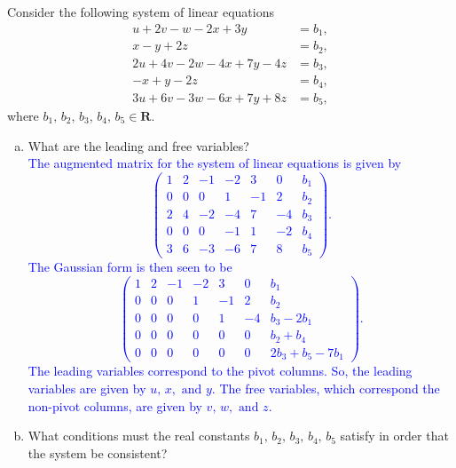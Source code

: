 \documentclass[a4paper,11pt]{article}
\newcommand{\R}{\mathbf{R}}
\newcommand{\BB}[1]{\textcolor{blue}{#1}}
\begin{document}
 Consider the following system of linear equations
\begin{align*}
  u+2v-w-2x+3y &= b_1, \\
  x-y+2z &= b_2, \\
  2u+4v-2w-4x+7y-4z &= b_3, \\
  -x+y-2z &= b_4, \\
  3u+6v-3w-6x+7y+8z &= b_5,
\end{align*}
where $b_1,\,b_2,\,b_3,\,b_4,\,b_5 \in \R$.
\begin{enumerate}[(a)]
\item What are the leading and free variables? \\

  \BB{
    The augmented matrix for the system of linear equations is given by
    \[
      \left(
        \begin{array}{rrrrrr|r}
          1 & 2 & -1 & -2 & 3 & 0 & b_{1} \\
          0 & 0 & 0 & 1 & -1 & 2 & b_{2} \\
          2 & 4 & -2 & -4 & 7 & -4 & b_{3} \\
          0 & 0 & 0 & -1 & 1 & -2 & b_{4} \\
          3 & 6 & -3 & -6 & 7 & 8 & b_{5}
        \end{array}
      \right).
    \]
    The Gaussian form is then seen to be
    \begin{equation}\label{Q4: gaussian form}
      \left(
        \begin{array}{rrrrrr|r}
          1 & 2 & -1 & -2 & 3 & 0 & b_1 \\
          0 & 0 & 0 & 1 & -1 & 2 & b_2 \\
          0 & 0 & 0 & 0 & 1 & -4 & b_3-2b_1 \\
          0 & 0 & 0 & 0 & 0 & 0 & b_2+b_4 \\
          0 & 0 & 0 & 0 & 0 & 0 & 2b_3+b_5-7b_1
        \end{array}
      \right).
    \end{equation}
    The leading variables correspond to the pivot columns. So, the leading
    variables are given by $u,\,x,\text{ and }y$. The free variables, which
    correspond the non-pivot columns, are given by $v,\,w,\text{ and }z$.
  }
  
\item\label{Q2:conditions} What conditions must the real constants
  $b_1,\,b_2,\,b_3,\,b_4,\,b_5$ satisfy in order that the system be consistent? \\


\end{enumerate}
\end{document}
